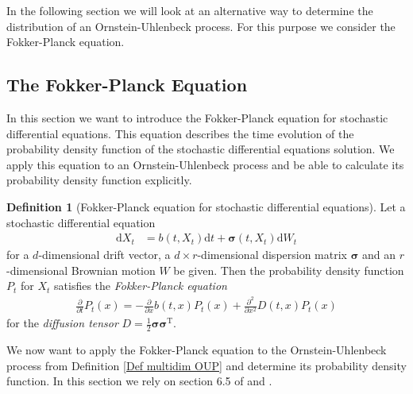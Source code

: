 \documentclass[11pt,titlepage]{article}
\theoremstyle{definition}
\newtheorem{definition}[theorem]{Definition}
\theoremstyle{remark}
\begin{document}
	In the following section we will look at an alternative way to determine the distribution of an Ornstein-Uhlenbeck process. For this purpose we consider the Fokker-Planck equation.
	
	\clearpage
	\subsection{The Fokker-Planck Equation}\label{Fokker-Planck}
	
	In this section we want to introduce the Fokker-Planck equation for stochastic differential 
	equations. This equation describes the time evolution of the probability density function 
	of the stochastic differential equations solution. We apply this equation to an 
	Ornstein-Uhlenbeck process and be able to calculate its probability density function explicitly.
	
	\begin{definition}[Fokker-Planck equation for stochastic differential equations]
		Let a stochastic differential equation
		\begin{align*}
			\mathrm{d}X_t &= b(t, X_t)\mathrm{d}t + \boldsymbol{\sigma}(t, X_t)\mathrm{d}W_t \label{SDE}
		\end{align*}
		for a $d$-dimensional drift vector, a $d\times r$-dimensional dispersion matrix $\boldsymbol{\sigma}$ and an $r$-dimensional Brownian motion $W$ be given. Then 
		the probability density function $P_t$ for $X_t$ satisfies the \textsl{Fokker-Planck equation}
		\begin{align*}
			\frac{\partial}{\partial t}P_t(x) = -\frac{\partial}{\partial x}b(t,x)P_t(x) +
			\frac{\partial^2}{\partial x^2}D(t, x)P_t(x)
		\end{align*}
		for the \textsl{diffusion tensor} $D = \frac{1}{2} \boldsymbol{\sigma}\boldsymbol{\sigma}^{\mathrm{T}}$.
	\end{definition}
	
	We now want to apply the Fokker-Planck equation to the Ornstein-Uhlenbeck process from Definition 
	\ref{Def multidim  OUP} and determine its probability density function. In this section we rely on section 6.5 of \cite{Risken1996} and \cite{Vatiwutipong2019}.
	
\end{document}
